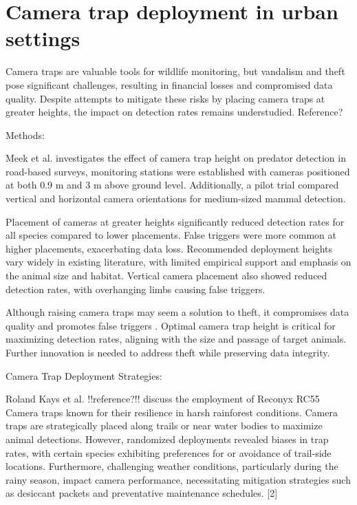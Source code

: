 \documentclass[class=report,11pt,crop=false]{standalone}
\begin{document}
\section{Camera trap deployment in urban settings} 

Camera traps are valuable tools for wildlife monitoring, but vandalism and theft pose significant challenges, resulting in financial losses and compromised data quality. Despite attempts to mitigate these risks by placing camera traps at greater heights, the impact on detection rates remains understudied. Reference?


Methods: 

Meek et al. \cite{meek2016higher} investigates the effect of camera trap height on predator detection in road-based surveys, monitoring stations were established with cameras positioned at both 0.9 m and 3 m above ground level. Additionally, a pilot trial compared vertical and horizontal camera orientations for medium-sized mammal detection. 

Placement of cameras at greater heights significantly reduced detection rates for all species compared to lower placements. False triggers were more common at higher placements, exacerbating data loss. Recommended deployment heights vary widely in existing literature, with limited empirical support and emphasis on the animal size and habitat. Vertical camera placement also showed reduced detection rates, with overhanging limbs causing false triggers. 

Although raising camera traps may seem a solution to theft, it compromises data quality and promotes false triggers \cite{meek2016higher}. Optimal camera trap height is critical for maximizing detection rates, aligning with the size and passage of target animals. Further innovation is needed to address theft while preserving data integrity. 

 

Camera Trap Deployment Strategies: 

Roland Kays et al. !!reference?!! discuss the employment of Reconyx RC55 Camera traps known for their resilience in harsh rainforest conditions. Camera traps are strategically placed along trails or near water bodies to maximize animal detections. However, randomized deployments revealed biases in trap rates, with certain species exhibiting preferences for or avoidance of trail-side locations. Furthermore, challenging weather conditions, particularly during the rainy season, impact camera performance, necessitating mitigation strategies such as desiccant packets and preventative maintenance schedules. [2] 
\end{document}
